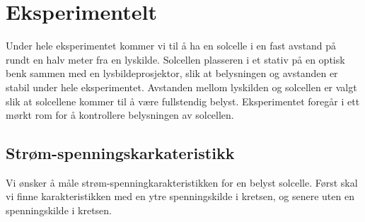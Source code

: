 \documentclass[%
 reprint,
 amsmath,amssymb,
 aps,
 norsk,
 booktabs
]{revtex4-1}
\begin{document}
\section{Eksperimentelt}
Under hele eksperimentet kommer vi til å ha en solcelle i en fast avstand på rundt en halv meter fra en lyskilde. Solcellen plasseren i et stativ på en optisk benk sammen med en lysbildeprosjektor, slik at belysningen og avstanden er stabil under hele eksperimentet. Avstanden mellom lyskilden og solcellen er valgt slik at solcellene kommer til å være fullstendig belyst. Eksperimentet foregår i ett mørkt rom for å kontrollere belysningen av solcellen.\\
\subsection{Strøm-spenningskarkateristikk}
Vi ønsker å måle strøm-spenningkarakteristikken for en belyst solcelle. Først skal vi finne karakteristikken med en ytre spenningskilde i kretsen, og senere uten en spenningskilde i kretsen.
\end{document}
